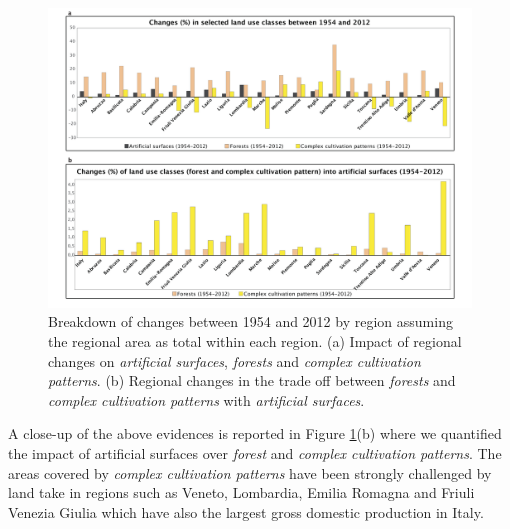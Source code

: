 \documentclass[APA,LATO1COL,doublespace]{WileyNJD-v2}
\newcommand{\toberevised}[1]{\emph{\textcolor{red}{#1}}} %
\begin{document}
\begin{figure}
    \centerline{ \includegraphics[width=450pt]{05_caso_nazionale_grafici.pdf} }
    \caption{Breakdown of changes between 1954 and 2012 by region assuming the regional area as total within each region.
             (a) Impact of regional changes on \textit{artificial surfaces}, \textit{forests} and \textit{complex cultivation patterns}.
             (b) Regional changes in the trade off between \textit{forests} and \textit{complex cultivation patterns} with \textit{artificial surfaces}.}
    \label{fig:caseIT_graphs}
\end{figure}

A close-up of the above evidences is reported in Figure \ref{fig:caseIT_graphs}(b) where we quantified the impact of artificial surfaces over \textit{forest} and \textit{complex cultivation patterns}. 
The areas covered by \textit{complex cultivation patterns} have been strongly challenged by land take in regions such as Veneto, Lombardia, Emilia Romagna and Friuli Venezia Giulia which have also the largest gross domestic production in Italy.

\end{document}
